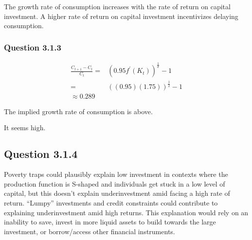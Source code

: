 \documentclass[10pt]{article}
\begin{document}
The growth rate of consumption increases with the rate of return on capital investment.
A higher rate of return on capital investment incentivizes delaying consumption.

\subsubsection{Question 3.1.3}

\begin{align}
    \frac{C_{t+1} - C_t}{C_t} = &(0.95 f^{\prime}\left(K_t\right))^{\frac{1}{\sigma}} - 1 \\
    = &\left(\left(0.95\right)\left(1.75\right)\right)^{\frac{1}{2}} - 1 \\
    \approx 0.289
\end{align}

The implied growth rate of consumption is above.

It seems high.

\subsection{Question 3.1.4}

Poverty traps could plausibly explain low investment in 
contexts where the production function is S-shaped and 
individuals get stuck in a low level of capital, but this 
doesn't explain underinvestment amid facing a high rate of return.
``Lumpy'' investments and credit constraints could contribute to explaining
underinvestment amid high returns. This explanation would rely on
an inability to save, invest in more liquid assets to 
build towards the large investment, or borrow/access other financial 
instruments. 
\end{document}
